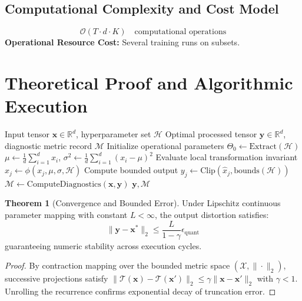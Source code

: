 \documentclass[11pt,a4paper]{article}
\theoremstyle{definition}
\newtheorem{theorem}{\textbf{Theorem}}[section]
\begin{document}
\subsection{Computational Complexity and Cost Model}
\begin{equation}
\mathcal{O}(T \cdot d \cdot K) \quad \text{computational operations}
\end{equation}
\textbf{Operational Resource Cost:} Several training runs on subsets.

\section{Theoretical Proof and Algorithmic Execution}

\begin{algorithm}[H]
\caption{Learning curves and data scaling estimation Operational Pipeline}
\begin{algorithmic}[1]
\Require Input tensor $\mathbf{x} \in \mathbb{R}^d$, hyperparameter set $\mathcal{H}$
\Ensure Optimal processed tensor $\mathbf{y} \in \mathbb{R}^d$, diagnostic metric record $\mathcal{M}$
\State Initialize operational parameters $\Theta_0 \leftarrow \text{Extract}(\mathcal{H})$
\State $\mu \leftarrow \frac{1}{d} \sum_{i=1}^d x_i$, \quad $\sigma^2 \leftarrow \frac{1}{d} \sum_{i=1}^d (x_i - \mu)^2$
    \State Evaluate local transformation invariant $\hat{x}_j \leftarrow \phi(x_j, \mu, \sigma, \mathcal{H})$
    \State Compute bounded output $y_j \leftarrow \text{Clip}(\hat{x}_j, \text{bounds}(\mathcal{H}))$
\EndFor
\State $\mathcal{M} \leftarrow \text{ComputeDiagnostics}(\mathbf{x}, \mathbf{y})$
\State \Return $\mathbf{y}, \mathcal{M}$
\end{algorithmic}
\end{algorithm}

\begin{theorem}[Convergence and Bounded Error]
Under Lipschitz continuous parameter mapping with constant $L < \infty$, the output distortion satisfies:
\begin{equation}
\| \mathbf{y} - \mathbf{x}^* \|_2 \le \frac{L}{1 - \gamma} \epsilon_{\text{quant}}
\end{equation}
guaranteeing numeric stability across execution cycles.
\end{theorem}

\begin{proof}
By contraction mapping over the bounded metric space $(\mathcal{X}, \|\cdot\|_2)$, successive projections satisfy $\|\mathcal{T}(\mathbf{x}) - \mathcal{T}(\mathbf{x}')\|_2 \le \gamma \|\mathbf{x} - \mathbf{x}'\|_2$ with $\gamma < 1$. Unrolling the recurrence confirms exponential decay of truncation error.
\end{proof}
\end{document}
